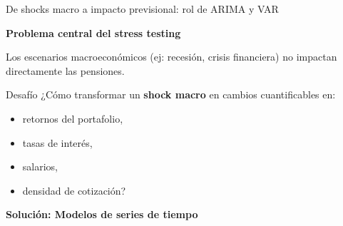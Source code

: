 \documentclass[10pt,aspectratio=169]{beamer}
\begin{document}
\begin{frame}{De shocks macro a impacto previsional: rol de ARIMA y VAR}

\textbf{Problema central del stress testing}

\vspace{0.2cm}

Los escenarios macroeconómicos (ej: recesión, crisis financiera) no impactan directamente las pensiones.

\begin{block}{Desafío}
¿Cómo transformar un \textbf{shock macro} en cambios cuantificables en:
\begin{itemize}
    \item retornos del portafolio,
    \item tasas de interés,
    \item salarios,
    \item densidad de cotización?
\end{itemize}
\end{block}

\vspace{0.3cm}

\textbf{Solución: Modelos de series de tiempo}
\end{frame}
\end{document}
